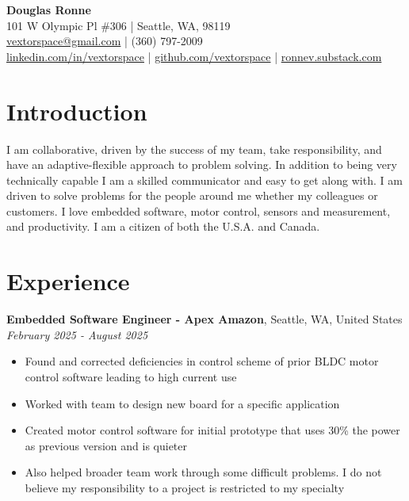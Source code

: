 \documentclass[letter,11pt]{article}
\begin{document}
\begin{center}
    {\Huge \textbf{Douglas Ronne}}\\
    \vspace{2mm}
    101 W Olympic Pl \#306 | Seattle, WA, 98119\\
    \href{mailto:vextorspace@gmail.com}{vextorspace@gmail.com} | (360) 797-2009\\
    \href{https://www.linkedin.com/in/vextorspace}{linkedin.com/in/vextorspace} | \href{https://github.com/vextorspace}{github.com/vextorspace} | \href{https://ronnev.substack.com}{ronnev.substack.com}
\end{center}

\section*{Introduction}

I am collaborative, driven by the success of my team, take responsibility, and have an adaptive-flexible approach to problem solving. In addition to being very technically capable I am a skilled communicator and easy to get along with. I am driven to solve problems for the people around me whether my colleagues or customers. I love embedded software, motor control, sensors and measurement, and productivity. I am a citizen of both the U.S.A. and Canada.

\section*{Experience}

\noindent
\textbf{Embedded Software Engineer - Apex Amazon}, Seattle, WA, United States \hfill \textit{February 2025 - August 2025}
\begin{itemize}[leftmargin=*,itemsep=0pt, parsep=0pt,label=$\diamond$]
\item Found and corrected deficiencies in control scheme of prior BLDC motor control software leading to high current use
\item Worked with team to design new board for a specific application
\item Created motor control software for initial prototype that uses 30\% the power as previous version and is quieter
\item Also helped broader team work through some difficult problems. I do not believe my responsibility to a project is restricted to my specialty
\end{itemize}
\end{document}

